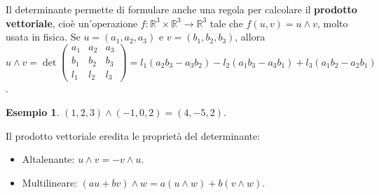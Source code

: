 \documentclass[a4paper]{article}
\theoremstyle{definition}
\newtheorem*{es}{Esempio}
\begin{document}
Il determinante permette di formulare anche una regola per calcolare il \textbf{prodotto vettoriale},
cioè un'operazione $f: \mathbb{R}^3 \times \mathbb{R}^3 \rightarrow \mathbb{R}^3$ tale che $f(u, v) = u \wedge v$, molto usata in fisica.
Se $u = (a_1, a_2, a_3)$ e $v = (b_1, b_2, b_3)$, allora $u \wedge v = \det \begin{pmatrix}
		a_1 & a_2 & a_3 \\
		b_1 & b_2 & b_3 \\
		l_1 & l_2 & l_3
	\end{pmatrix} = l_1(a_2b_3 - a_3b_2) - l_2(a_1b_3 - a_3b_1) + l_3(a_1b_2 - a_2b_1)$.
\begin{es}
	$(1, 2, 3) \wedge (-1, 0, 2) = (4, -5, 2)$.
\end{es}
Il prodotto vettoriale eredita le proprietà del determinante:
\begin{itemize}
	\item Altalenante: $u \wedge v = - v \wedge u$.
	\item Multilineare: $(au + bv) \wedge w = a(u \wedge w) + b(v \wedge w)$.
\end{itemize}
\end{document}
